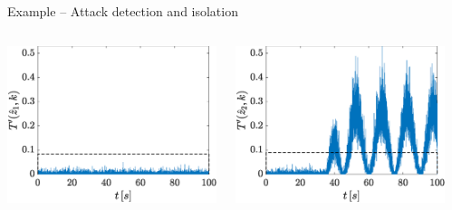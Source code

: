 \documentclass[presentation]{beamer}
\begin{document}
\begin{frame}{Example -- Attack detection and isolation}
    
	\begin{columns}
		\begin{column}{0.25\linewidth}
			\includegraphics[width=\linewidth]{fig/det1_okThr.eps}
		\end{column}
		\begin{column}{0.25\linewidth}
			\includegraphics[width=\linewidth]{fig/det2_okThr.eps}
		\end{column}
		\begin{column}{0.25\linewidth}

\end{column}
\end{columns}
\end{frame}
\end{document}
